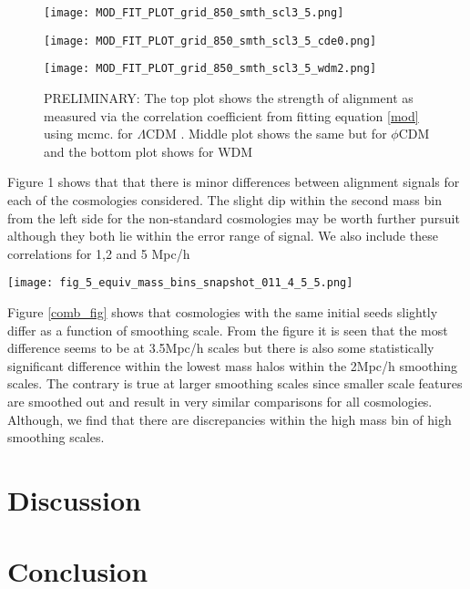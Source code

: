 \documentclass[a4paper,fleqn,usenatbib]{mnras}
\def \lcdm{$\Lambda$CDM }
\def \qcdm{$\phi$CDM }
\begin{document}
\begin{figure}
\centering
\texttt{[image: MOD\_FIT\_PLOT\_grid\_850\_smth\_scl3\_5.png]}
\label{cor_fig} 
\end{figure}
\begin{figure}
\centering
\texttt{[image: MOD\_FIT\_PLOT\_grid\_850\_smth\_scl3\_5\_cde0.png]}\label{cor_fig_cde0} 

\end{figure}
\begin{figure}
\centering
\texttt{[image: MOD\_FIT\_PLOT\_grid\_850\_smth\_scl3\_5\_wdm2.png]}\label{cor_fig_wdm2} 
\caption{PRELIMINARY: The top plot shows the strength of alignment as measured via the correlation coefficient from fitting equation \ref{mod} using mcmc. for \lcdm. Middle plot shows the same but for \qcdm and the bottom plot shows for WDM}
\end{figure}
Figure 1 shows that that there is minor differences between alignment signals for each of the cosmologies considered. The slight dip within the second mass bin from the left side for the non-standard cosmologies may be worth further pursuit although they both lie within the error range of \citet{Trowland_13} signal. We also include these correlations for 1,2 and 5 Mpc/h

\begin{figure*}
\centering
\texttt{[image: fig\_5\_equiv\_mass\_bins\_snapshot\_011\_4\_5\_5.png]}
\label{comb_fig} 
\caption{This figure shows overplotting of 3 cosmologies as in legend for 3 smoothing scales}
\end{figure*}

Figure \ref{comb_fig} shows that cosmologies with the same initial seeds slightly differ as a function of smoothing scale. From the figure it is seen that the most difference seems to be at 3.5Mpc/h scales but there is also some statistically significant difference within the lowest mass halos within the 2Mpc/h smoothing scales. The contrary is true at larger smoothing scales since smaller scale features are smoothed out and result in very similar comparisons for all cosmologies. Although, we find that there are discrepancies within the high mass bin of high smoothing scales.
\\



\section{Discussion}\label{discussion}



\section{Conclusion}\label{conclusion}


 

\bsp	%
\label{lastpage}
\end{document}
